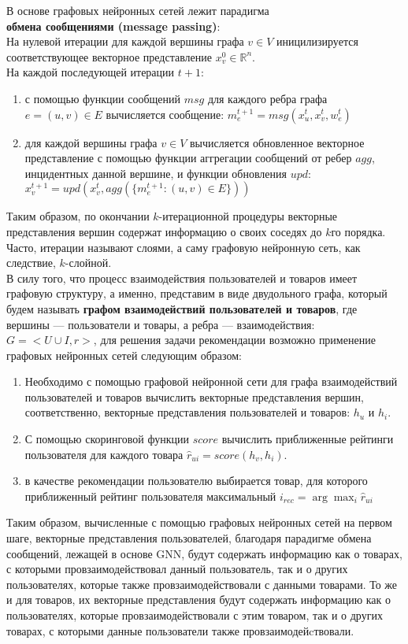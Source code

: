 \documentclass{mipt-thesis-ms}
\begin{document}
В основе графовых нейронных сетей лежит парадигма\\{\bf обмена сообщениями (message passing)}:
\\На нулевой итерации для каждой вершины графа $v \in V$ иницилизируется соответствующее векторное представление $x_v^0 \in \mathbb{R}^n$.
\\На каждой последующей итерации $t+1$:
\begin{enumerate}
    \item с помощью функции сообщений $msg$ для каждого ребра графа $e = (u, v) \in E$ вычисляется сообщение: $m_e^{t+1} = msg(x_u^t, x_v^t, w_e^t)$
    \item для каждой вершины графа $v \in V$ вычисляется обновленное векторное представление с помощью функции аггрегации сообщений от ребер $agg$, инцидентных данной вершине, и функции обновления $upd$: $x_v^{t+1} = upd(x_v^t, agg(\{m_e^{t+1}: (u, v) \in E\}))$
\end{enumerate}

Таким образом, по окончании $k$-итерационной процедуры векторные представления вершин содержат информацию о своих соседях до $k$го порядка. Часто, итерации называют слоями, а саму графовую нейронную сеть, как следствие, $k$-слойной.
\\

В силу того, что процесс взаимодействия пользователей и товаров имеет графовую структуру, а именно, представим в виде двудольного графа, который будем называть {\bf графом взаимодействий пользователей и товаров}, где вершины --- пользователи и товары, а ребра --- взаимодействия: $G = <U \cup I, r>$, для решения задачи рекомендации возможно применение графовых нейронных сетей следующим образом:
\begin{enumerate}
\item Необходимо с помощью графовой нейронной сети для графа взаимодействий пользователей и товаров вычислить векторные представления вершин, соответственно, векторные представления пользователей и товаров: $h_u$ и $h_i$.
\item С помощью скоринговой функции $score$ вычислить приближенные рейтинги пользователя для каждого товара $\hat r_{ui} = score(h_v, h_i)$.
\item в качестве рекомендации пользователю выбирается товар, для которого приближенный рейтинг пользователя максимальный $i_{rec} = \arg \max_i \hat r_{ui}$
\end{enumerate}

Таким образом, вычисленные с помощью графовых нейронных сетей на первом шаге, векторные представления пользователей, благодаря парадигме обмена сообщений, лежащей в основе GNN, будут содержать информацию как о товарах, с которыми провзаимодействовал данный пользователь, так и о других пользователях, которые также провзаимодействовали с данными товарами. То же и для товаров, их векторные представления будут содержать информацию как о пользователях, которые провзаимодействовали с этим товаром, так и о других товарах, с которыми данные пользователи также провзаимодейcтвовали.\\
\end{document}
